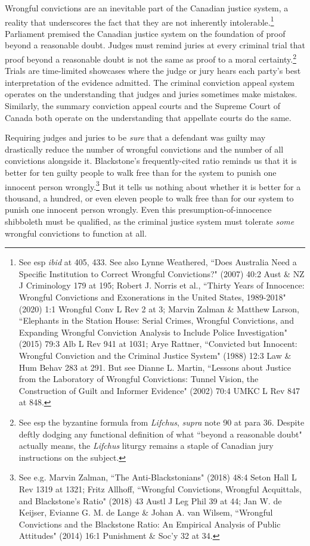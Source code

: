 Wrongful convictions are an inevitable part of the Canadian justice system, a reality that underscores the fact that they are not inherently intolerable.\footnote{See esp \textit{ibid} at 405, 433. See also Lynne Weathered, ``Does Australia Need a Specific Institution to Correct Wrongful Convictions?" (2007) 40:2 Aust \& NZ J Criminology 179 at 195; Robert J. Norris et al., ``Thirty Years of Innocence: Wrongful Convictions and Exonerations in the United States, 1989-2018" (2020) 1:1 Wrongful Conv L Rev 2 at 3; Marvin Zalman \& Matthew Larson, ``Elephants in the Station House: Serial Crimes, Wrongful Convictions, and Expanding Wrongful Conviction Analysis to Include Police Investigation" (2015) 79:3 Alb L Rev 941 at 1031; Arye Rattner, ``Convicted but Innocent: Wrongful Conviction and the Criminal Justice System" (1988) 12:3 Law \& Hum Behav 283 at 291. But see Dianne L. Martin, ``Lessons about Justice from the Laboratory of Wrongful Convictions: Tunnel Vision, the Construction of Guilt and Informer Evidence" (2002) 70:4 UMKC L Rev 847 at 848.} Parliament premised the Canadian justice system on the foundation of proof beyond a reasonable doubt. Judges must remind juries at every criminal trial that proof beyond a reasonable doubt is not the same as proof to a moral certainty.\footnote{See esp the byzantine formula from \textit{Lifchus}, \textit{supra} note 90 at para 36. Despite deftly dodging any functional definition of what ``beyond a reasonable doubt" actually means, the \textit{Lifchus} liturgy remains a staple of Canadian jury instructions on the subject.} Trials are time-limited showcases where the judge or jury hears each party's best interpretation of the evidence admitted. The criminal conviction appeal system operates on the understanding that judges and juries sometimes make mistakes. Similarly, the summary conviction appeal courts and the Supreme Court of Canada both operate on the understanding that appellate courts do the same. 

Requiring judges and juries to be \textit{sure} that a defendant was guilty may drastically reduce the number of wrongful convictions and the number of all convictions alongside it. Blackstone's frequently-cited ratio reminds us that it is better for ten guilty people to walk free than for the system to punish one innocent person wrongly.\footnote{See e.g. Marvin Zalman, ``The Anti-Blackstonians" (2018) 48:4 Seton Hall L Rev 1319 at 1321; Fritz Allhoff, ``Wrongful Convictions, Wrongful Acquittals, and Blackstone's Ratio" (2018) 43 Austl J Leg Phil 39 at 44; Jan W. de Keijser, Evianne G. M. de Lange \& Johan A. van Wilsem, ``Wrongful Convictions and the Blackstone Ratio: An Empirical Analysis of Public Attitudes" (2014) 16:1 Punishment \& Soc'y 32 at 34.} But it tells us nothing about whether it is better for a thousand, a hundred, or even eleven people to walk free than for our system to punish one innocent person wrongly. Even this presumption-of-innocence shibboleth must be qualified, as the criminal justice system must tolerate \textit{some} wrongful convictions to function at all. 

